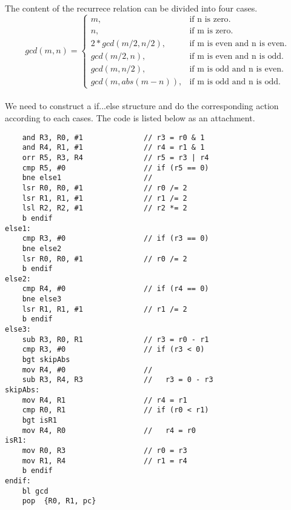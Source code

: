 \paragraph{}
The content of the recurrece relation can be divided into four cases.
\begin{equation}
  gcd(m, n)=\begin{cases}
    m, & \text{if n is zero}.\\
    n, & \text{if m is zero}.\\
    2 * gcd(m / 2, n / 2), & \text{if m is even and n is even}.\\
    gcd(m / 2, n), & \text{if m is even and n is odd}.\\
    gcd(m, n / 2), & \text{if m is odd and n is even}.\\
    gcd(m, abs(m - n)), & \text{if m is odd and n is odd}.
  \end{cases}
\end{equation}
\paragraph{}
We need to construct a if...else structure and do the corresponding action according to each cases. The code is listed below as an attachment.
\begin{lstlisting}
    and R3, R0, #1              // r3 = r0 & 1
    and R4, R1, #1              // r4 = r1 & 1
    orr R5, R3, R4              // r5 = r3 | r4
    cmp R5, #0                  // if (r5 == 0)
    bne else1                   //
    lsr R0, R0, #1              // r0 /= 2
    lsr R1, R1, #1              // r1 /= 2
    lsl R2, R2, #1              // r2 *= 2
    b endif
else1:
    cmp R3, #0                  // if (r3 == 0)
    bne else2
    lsr R0, R0, #1              // r0 /= 2
    b endif
else2:
    cmp R4, #0                  // if (r4 == 0)
    bne else3
    lsr R1, R1, #1              // r1 /= 2
    b endif
else3:
    sub R3, R0, R1              // r3 = r0 - r1
    cmp R3, #0                  // if (r3 < 0)
    bgt skipAbs
    mov R4, #0                  //
    sub R3, R4, R3              //   r3 = 0 - r3
skipAbs:
    mov R4, R1                  // r4 = r1
    cmp R0, R1                  // if (r0 < r1)
    bgt isR1
    mov R4, R0                  //   r4 = r0
isR1:
    mov R0, R3                  // r0 = r3
    mov R1, R4                  // r1 = r4
    b endif
endif:
    bl gcd
    pop  {R0, R1, pc}
\end{lstlisting}
